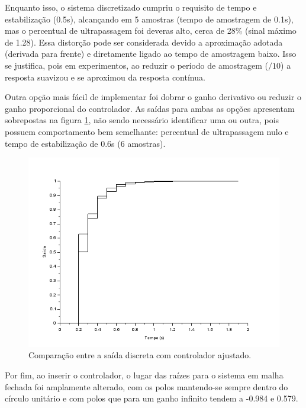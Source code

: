 Enquanto isso, o sistema discretizado cumpriu o requisito de tempo e estabilização (0.5s), alcançando em 5 amostras (tempo de amostragem de 0.1s), mas o percentual de ultrapassagem foi deveras alto, cerca de 28\% (sinal máximo de 1.28). Essa distorção pode ser considerada devido a aproximação adotada (derivada para frente) e diretamente ligado ao tempo de amostragem baixo. Isso se justifica, pois em experimentos, ao reduzir o período de amostragem ($/10$) a resposta suavizou e se aproximou da resposta contínua. 

Outra opção mais fácil de implementar foi dobrar o ganho derivativo ou reduzir o ganho proporcional do controlador. As saídas para ambas as opções apresentam sobrepostas na figura \ref{mf:3}, não sendo necessário identificar uma ou outra, pois possuem comportamento bem semelhante: percentual de ultrapassagem nulo e tempo de estabilização de 0.6s (6 amostras).

\begin{figure}[H]
\begin{center}
\includegraphics[width=12cm]{images/mf/sobreposto.png}
\caption{Comparação entre a saída discreta com controlador ajustado.}
\label{mf:3} 
\end{center}
\end{figure}

Por fim, ao inserir o controlador, o lugar das raízes para o sistema em malha fechada foi amplamente alterado, com os polos mantendo-se sempre dentro do círculo unitário e com polos que para um ganho infinito tendem a -0.984 e 0.579.

